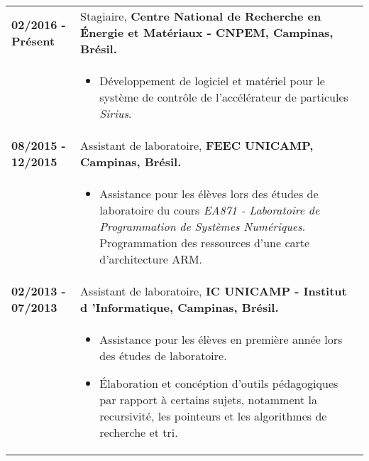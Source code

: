 \documentclass[10pt, a4paper]{article}
\begin{document}
\begin{tabular}{p{} p{}}

\textbf{02/2016 - Présent}  & Stagiaire, \textbf{Centre National de
Recherche en Énergie et Matériaux - CNPEM, Campinas, Brésil.}
 \\
  & 
  \begin{itemize}
    \item Développement de logiciel et matériel pour le système
    de contrôle de l'accélérateur de particules \textit{Sirius}.
    
	\end{itemize}\\

\textbf{08/2015 - 12/2015}  & Assistant de laboratoire, \textbf{FEEC
 UNICAMP, Campinas, Brésil.}
 \\
  &
  \begin{itemize}
    \item Assistance pour les élèves lors des études de
    laboratoire du cours \textit{EA871 - Laboratoire de Programmation de
    Systèmes Numériques}. Programmation des ressources 
    d'une carte d'architecture ARM.
    
	\end{itemize}\\


 \textbf{02/2013 - 07/2013}   & Assistant de laboratoire, \textbf{IC UNICAMP -
 Institut d 'Informatique, Campinas, Brésil.} \\
  & \begin{itemize}
    \item Assistance pour les élèves en première année lors des études de
    laboratoire.
    \item Élaboration et concéption d'outils pédagogiques par rapport
    à certains sujets, notamment la recursivité, les pointeurs et les
    algorithmes de recherche et  tri.
	\end{itemize}\\


\end{tabular}
\end{document}
